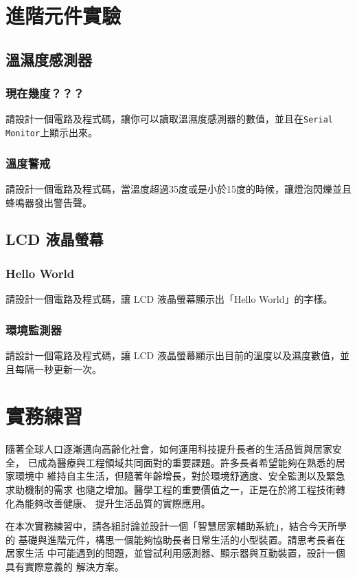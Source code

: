 \documentclass[12pt,a4paper]{article}
\begin{document}
\section{進階元件實驗}

\subsection{溫濕度感測器}

\subsubsection{現在幾度？？？}
請設計一個電路及程式碼，讓你可以讀取溫濕度感測器的數值，並且在\texttt{Serial Monitor}上顯示出來。

\subsubsection{溫度警戒}
請設計一個電路及程式碼，當溫度超過35度或是小於15度的時候，讓燈泡閃爍並且蜂鳴器發出警告聲。

\subsection{LCD 液晶螢幕}

\subsubsection{Hello World}
請設計一個電路及程式碼，讓 LCD 液晶螢幕顯示出「Hello World」的字樣。

\subsubsection{環境監測器}
請設計一個電路及程式碼，讓 LCD 液晶螢幕顯示出目前的溫度以及濕度數值，並且每隔一秒更新一次。

\section{實務練習}

隨著全球人口逐漸邁向高齡化社會，如何運用科技提升長者的生活品質與居家安全，
已成為醫療與工程領域共同面對的重要課題。許多長者希望能夠在熟悉的居家環境中
維持自主生活，但隨著年齡增長，對於環境舒適度、安全監測以及緊急求助機制的需求
也隨之增加。醫學工程的重要價值之一，正是在於將工程技術轉化為能夠改善健康、
提升生活品質的實際應用。

在本次實務練習中，請各組討論並設計一個「智慧居家輔助系統」，結合今天所學的
基礎與進階元件，構思一個能夠協助長者日常生活的小型裝置。請思考長者在居家生活
中可能遇到的問題，並嘗試利用感測器、顯示器與互動裝置，設計一個具有實際意義的
解決方案。
\end{document}
